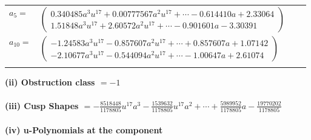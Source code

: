 \documentclass[1p]{elsarticle_modified}
\theoremstyle{definition}
\begin{document}
\begin{tabular}{m{7pt} m{180pt} m{7pt} m{180pt} }
\flushright $a_{5}=$&$\begin{pmatrix}0.340485 a^{3} u^{17}+0.00777567 a^{2} u^{17}+\cdots-0.614410 a+2.33064\\1.51848 a^{3} u^{17}+2.60572 a^{2} u^{17}+\cdots-0.901601 a-3.30391\end{pmatrix}$ \\
\flushright $a_{10}=$&$\begin{pmatrix}-1.24583 a^{3} u^{17}-0.857607 a^{2} u^{17}+\cdots+0.857607 a+1.07142\\-2.10677 a^{3} u^{17}-0.544094 a^{2} u^{17}+\cdots-1.00647 a+2.61074\end{pmatrix}$\\&\end{tabular}
\flushleft \textbf{(ii) Obstruction class $= -1$}\\~\\
\flushleft \textbf{(iii) Cusp Shapes $= -\frac{8518448}{1178805} u^{17} a^3-\frac{1539632}{1178805} u^{17} a^2+\cdots+\frac{5989952}{1178805} a-\frac{19770202}{1178805}$}\\~\\
\newpage\renewcommand{\arraystretch}{1}
\flushleft \textbf{(iv) u-Polynomials at the component}\newline \\
\end{document}
